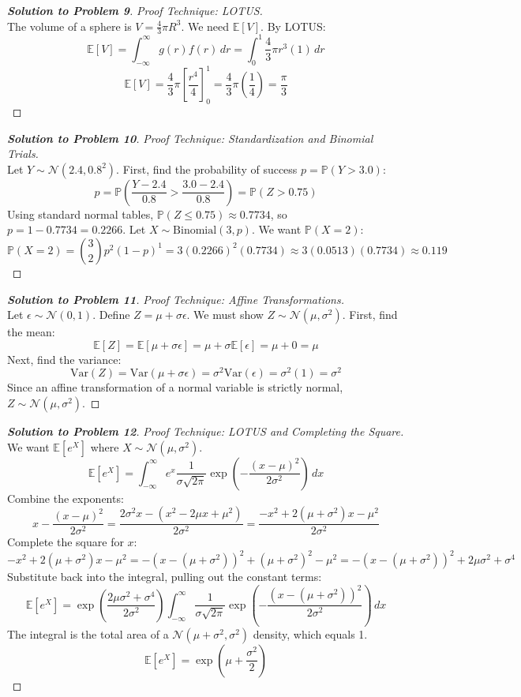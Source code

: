 \documentclass[11pt, a4paper]{article}
\theoremstyle{definition}
\theoremstyle{remark}
\newcommand{\E}{\mathbb{E}}
\newcommand{\Prob}{\mathbb{P}}
\begin{document}
\begin{proof}[\textbf{Solution to Problem 9}]
\textit{Proof Technique: LOTUS.} \\
The volume of a sphere is $V = \frac{4}{3}\pi R^3$. We need $\E[V]$. By LOTUS:
\[ \E[V] = \int_{-\infty}^{\infty} g(r)f(r) \, dr = \int_{0}^{1} \frac{4}{3}\pi r^3 (1) \, dr \]
\[ \E[V] = \frac{4}{3}\pi \left[ \frac{r^4}{4} \right]_0^1 = \frac{4}{3}\pi \left( \frac{1}{4} \right) = \frac{\pi}{3} \]
\end{proof}

\begin{proof}[\textbf{Solution to Problem 10}]
\textit{Proof Technique: Standardization and Binomial Trials.} \\
Let $Y \sim \mathcal{N}(2.4, 0.8^2)$. First, find the probability of success $p = \Prob(Y > 3.0)$:
\[ p = \Prob\left(\frac{Y - 2.4}{0.8} > \frac{3.0 - 2.4}{0.8}\right) = \Prob(Z > 0.75) \]
Using standard normal tables, $\Prob(Z \leq 0.75) \approx 0.7734$, so $p = 1 - 0.7734 = 0.2266$.
Let $X \sim \text{Binomial}(3, p)$. We want $\Prob(X = 2)$:
\[ \Prob(X = 2) = \binom{3}{2} p^2 (1-p)^1 = 3(0.2266)^2(0.7734) \approx 3(0.0513)(0.7734) \approx 0.119 \]
\end{proof}

\begin{proof}[\textbf{Solution to Problem 11}]
\textit{Proof Technique: Affine Transformations.} \\
Let $\epsilon \sim \mathcal{N}(0, 1)$. Define $Z = \mu + \sigma\epsilon$. We must show $Z \sim \mathcal{N}(\mu, \sigma^2)$.
First, find the mean:
\[ \E[Z] = \E[\mu + \sigma\epsilon] = \mu + \sigma\E[\epsilon] = \mu + 0 = \mu \]
Next, find the variance:
\[ \text{Var}(Z) = \text{Var}(\mu + \sigma\epsilon) = \sigma^2\text{Var}(\epsilon) = \sigma^2(1) = \sigma^2 \]
Since an affine transformation of a normal variable is strictly normal, $Z \sim \mathcal{N}(\mu, \sigma^2)$.
\end{proof}

\begin{proof}[\textbf{Solution to Problem 12}]
\textit{Proof Technique: LOTUS and Completing the Square.} \\
We want $\E[e^X]$ where $X \sim \mathcal{N}(\mu, \sigma^2)$.
\[ \E[e^X] = \int_{-\infty}^{\infty} e^x \frac{1}{\sigma\sqrt{2\pi}} \exp\left(-\frac{(x-\mu)^2}{2\sigma^2}\right) \, dx \]
Combine the exponents:
\[ x - \frac{(x-\mu)^2}{2\sigma^2} = \frac{2\sigma^2 x - (x^2 - 2\mu x + \mu^2)}{2\sigma^2} = \frac{-x^2 + 2(\mu + \sigma^2)x - \mu^2}{2\sigma^2} \]
Complete the square for $x$:
\[ -x^2 + 2(\mu + \sigma^2)x - \mu^2 = -(x - (\mu + \sigma^2))^2 + (\mu + \sigma^2)^2 - \mu^2 = -(x - (\mu + \sigma^2))^2 + 2\mu\sigma^2 + \sigma^4 \]
Substitute back into the integral, pulling out the constant terms:
\[ \E[e^X] = \exp\left(\frac{2\mu\sigma^2 + \sigma^4}{2\sigma^2}\right) \int_{-\infty}^{\infty} \frac{1}{\sigma\sqrt{2\pi}} \exp\left(-\frac{(x - (\mu + \sigma^2))^2}{2\sigma^2}\right) \, dx \]
The integral is the total area of a $\mathcal{N}(\mu+\sigma^2, \sigma^2)$ density, which equals 1.
\[ \E[e^X] = \exp\left(\mu + \frac{\sigma^2}{2}\right) \]
\end{proof}
\end{document}
